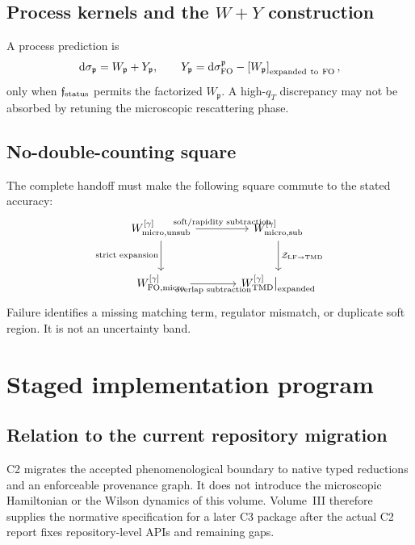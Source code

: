 \documentclass[11pt]{article}
\newcommand{\dd}{\mathrm{d}}
\newcommand{\LF}{\mathrm{LF}}
\newcommand{\TMD}{\mathrm{TMD}}
\newcommand{\cZ}{\mathcal Z}
\newcommand{\unsub}{\mathrm{unsub}}
\newcommand{\subtr}{\mathrm{sub}}
\newcommand{\micro}{\mathrm{micro}}
\begin{document}
\subsection{Process kernels and the \texorpdfstring{\(W+Y\)}{W+Y} construction}

A process prediction is
\begin{equation}
 \dd\sigma_{\mathfrak p}
 =W_{\mathfrak p}
  +Y_{\mathfrak p},
 \qquad
 Y_{\mathfrak p}
 =\dd\sigma_{\rm FO}^{\mathfrak p}
  -\left[W_{\mathfrak p}\right]_{\rm expanded\ to\ FO},
\label{eq:volume5-wy}
\end{equation}
only when \(\mathfrak f_{\rm status}\) permits the factorized
\(W_{\mathfrak p}\).  A high-\(q_T\) discrepancy may not be absorbed by
retuning the microscopic rescattering phase.

\subsection{No-double-counting square}

The complete handoff must make the following square commute to the stated
accuracy:
\begin{equation}
\begin{tikzcd}[column sep=large,row sep=large]
 W_{\micro,\unsub}^{[\gamma]}
 \arrow[r,"\text{soft/rapidity subtraction}"]
 \arrow[d,"\text{strict expansion}"']
 & W_{\micro,\subtr}^{[\gamma]}
 \arrow[d,"\cZ_{\LF\to\TMD}"]
 \\
 W_{\rm FO,\micro}^{[\gamma]}
 \arrow[r,"\text{overlap subtraction}"']
 & W_{\TMD}^{[\gamma]}\big|_{\rm expanded}
\end{tikzcd}
\label{eq:no-double-counting-square}
\end{equation}
Failure identifies a missing matching term, regulator mismatch, or duplicate
soft region.  It is not an uncertainty band.

\section{Staged implementation program}
\label{sec:stages}

\subsection{Relation to the current repository migration}

C2 migrates the accepted phenomenological boundary to native typed reductions
and an enforceable provenance graph.  It does not introduce the microscopic
Hamiltonian or the Wilson dynamics of this volume.  Volume~III therefore
supplies the normative specification for a later C3 package after the actual
C2 report fixes repository-level APIs and remaining gaps.
\end{document}
